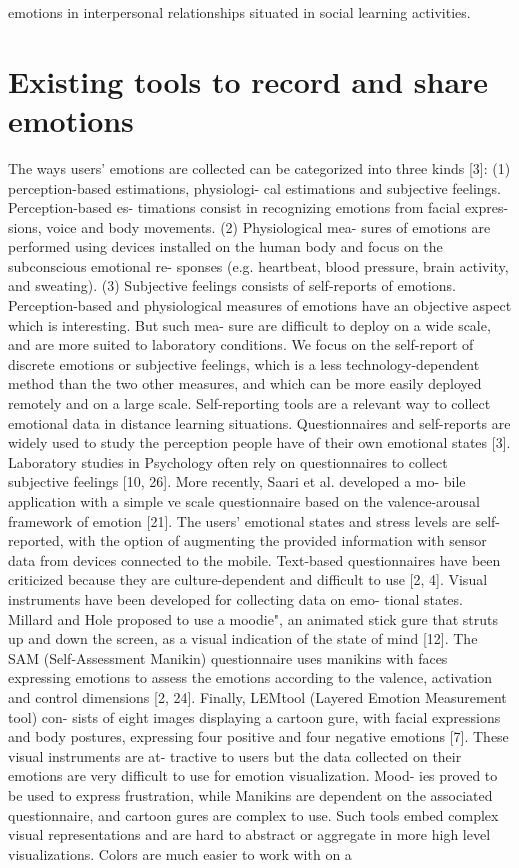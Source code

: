 \documentclass[chi_draft]{sigchi}
\begin{document}
emotions in interpersonal relationships situated in social learning activities.

\section{Existing tools to record and share emotions}
The ways users’ emotions are collected can be categorized into three kinds [3]: (1) perception-based estimations, physiologi- cal estimations and subjective feelings. Perception-based es- timations consist in recognizing emotions from facial expres- sions, voice and body movements. (2) Physiological mea- sures of emotions are performed using devices installed on the human body and focus on the subconscious emotional re- sponses (e.g. heartbeat, blood pressure, brain activity, and sweating). (3) Subjective feelings consists of self-reports of emotions. Perception-based and physiological measures of emotions have an objective aspect which is interesting. But such mea- sure are difficult to deploy on a wide scale, and are more suited to laboratory conditions. We focus on the self-report of discrete emotions or subjective feelings, which is a less technology-dependent method than the two other measures, and which can be more easily deployed remotely and on a large scale. Self-reporting tools are a relevant way to collect emotional data in distance learning situations. Questionnaires and self-reports are widely used to study the perception people have of their own emotional states [3]. Laboratory studies in Psychology often rely on questionnaires to collect subjective feelings [10, 26]. More recently, Saari et al. developed a mo- bile application with a simple ve scale questionnaire based on the valence-arousal framework of emotion [21]. The users' emotional states and stress levels are self-reported, with the option of augmenting the provided information with sensor data from devices connected to the mobile. Text-based questionnaires have been criticized because they are culture-dependent and difficult to use [2, 4]. Visual instruments have been developed for collecting data on emo- tional states. Millard and Hole proposed to use a moodie", an animated stick gure that struts up and down the screen, as a visual indication of the state of mind [12]. The SAM (Self-Assessment Manikin) questionnaire uses manikins with faces expressing emotions to assess the emotions according to the valence, activation and control dimensions [2, 24]. Finally, LEMtool (Layered Emotion Measurement tool) con- sists of eight images displaying a cartoon gure, with facial expressions and body postures, expressing four positive and four negative emotions [7]. These visual instruments are at- tractive to users but the data collected on their emotions are very difficult to use for emotion visualization. Mood- ies proved to be used to express frustration, while Manikins are dependent on the associated questionnaire, and cartoon gures are complex to use. Such tools embed complex visual representations and are hard to abstract or aggregate in more high level visualizations. Colors are much easier to work with on a 
\end{document}
